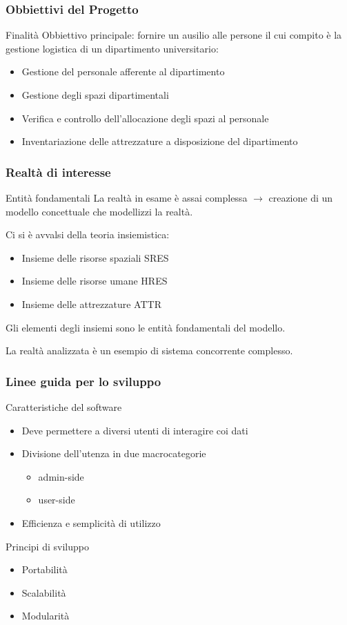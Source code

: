 \begin{frame}
\frametitle{Obbiettivi del Progetto}
\begin{block}{Finalità}
Obbiettivo principale: fornire un ausilio alle
persone il cui compito è la gestione logistica di 
un dipartimento universitario:
\begin{itemize}
\item Gestione del personale afferente al dipartimento
\item Gestione degli spazi dipartimentali
\item Verifica e controllo dell'allocazione degli spazi al personale
\item Inventariazione delle attrezzature a disposizione del dipartimento
\end{itemize}
\end{block}
\end{frame}

\begin{frame}
\frametitle{Realtà di interesse}
\begin{block}{Entità fondamentali}
La realtà in esame è assai complessa $\rightarrow$
creazione di un modello concettuale
che modellizzi la realtà.

Ci si è avvalsi della teoria insiemistica:
\begin{itemize}
\item Insieme delle risorse spaziali SRES
\item Insieme delle risorse umane HRES
\item Insieme delle attrezzature ATTR
\end{itemize}
Gli elementi degli insiemi sono le entità fondamentali
del modello.
\end{block}
\begin{block}{}
La realtà analizzata è un esempio di sistema concorrente
complesso.
\end{block}
\end{frame}


\begin{frame}
\frametitle{Linee guida per lo sviluppo}
\begin{block}{Caratteristiche del software}
\begin{itemize}
\item Deve permettere a diversi utenti di interagire coi dati
\item Divisione dell'utenza in due macrocategorie
\begin{itemize}
\item admin-side
\item user-side
\end{itemize}
\item Efficienza e semplicità di utilizzo
\end{itemize}
\end{block}
\begin{block}{Principi di sviluppo}
\begin{itemize}
\item Portabilità
\item Scalabilità
\item Modularità
\end{itemize}
\end{block}
\end{frame}


